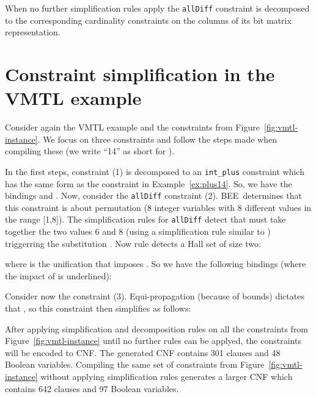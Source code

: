\documentclass{tlp}
\newcommand{\bee}{\textsf{BEE}}
\begin{document}
When no further simplification rules apply the \texttt{allDiff}
constraint is decomposed to the corresponding cardinality constraints
on the columns of its bit matrix representation.



\section{Constraint simplification in the VMTL example}

Consider again the VMTL example and the constraints from
Figure~\ref{fig:vmtl-instance}. We focus on three
constraints and follow the steps made when compiling these (we write
``14'' as short for ). 

\smallskip


\smallskip\noindent In the first steps, constraint (1) is decomposed to
an \texttt{int\_plus} constraint which has the same form as the
constraint in Example~\ref{ex:plus14}. So, we have the bindings
 and
. 
Now, consider the \texttt{allDiff} constraint (2). \bee\ determines
that this constraint is about permutation (8 integer variables with 8
different values in the range [1,8]). The simplification rules for
\texttt{allDiff} detect that  must take together
the two values 6 and 8 (using a simplification rule similar to
) triggerring the substitution .  Now rule  detects a Hall set
 of size two:

where  is the unification that imposes
. So we have the following
bindings (where the impact of  is underlined): 







Consider now the constraint (3). Equi-propagation (because of bounds)
dictates that , so this
constraint then simplifies as follows:



\medskip After applying simplification and decomposition rules on all
the constraints from Figure~\ref{fig:vmtl-instance} until no further
rules can be applyed, the constraints will be encoded to CNF.  The
generated CNF contains 301 clauses and 48 Boolean variables.
Compiling the same set of constraints from
Figure~\ref{fig:vmtl-instance} without applying simplification rules
generates a larger CNF which contains 642 clauses and 97 Boolean
variables.
\end{document}
